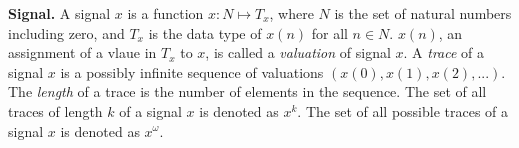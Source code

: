 {\bf Signal.}
A signal $x$ is a function $x: N \mapsto T_x$, where $N$ is the set of natural numbers including zero, and $T_x$ is the data type of $x(n)$ for all $n \in N$.
$x(n)$, an assignment of a vlaue in $T_x$ to $x$, is called a \emph{valuation} of signal $x$. 
A \emph{trace} of a signal $x$ is a possibly infinite sequence of valuations $(x(0), x(1), x(2),... )$. 
The \emph{length} of a trace is the number of elements in the sequence. 
The set of all traces of length $k$ of a signal $x$ is denoted as $x^k$. 
The set of all possible traces of a signal $x$ is denoted as $x^{\omega}$. 



